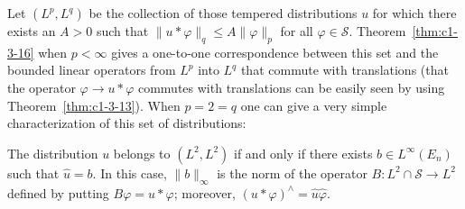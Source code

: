 Let $(L^{p}, L^{q})$ be the collection of those tempered distributions $u$ for
which there exists an $A > 0$ such that $\|u * \varphi\|_{q} \leq A \|\varphi\|_{p}$
for all $\varphi \in \mathscr{S}$. Theorem~\ref{thm:c1-3-16} when
$p < \infty$ gives a one-to-one correspondence between this set and the
bounded linear operators from $L^{p}$ into $L^{q}$ that commute with
translations (that the operator $\varphi \to u * \varphi$ commutes with
translations can be easily seen by using Theorem~\ref{thm:c1-3-13}). When
$p = 2 = q$ one can give a very simple characterization of this set of
distributions:

\begin{theorem}\label{thm:c1-3-18}
The distribution $u$ belongs to $(L^{2}, L^{2})$ if and only if there exists
$b \in L^{\infty}(E_{n})$ such that $\hat{u} = b$. In this case,
$\|b\|_{\infty}$ is the norm of the operator
$B\colon L^{2} \cap \mathscr{S} \to L^{2}$ defined by putting
$B\varphi = u * \varphi$; moreover, $(u * \varphi)^{\wedge} = \hat{u}\hat{\varphi}$.
\end{theorem}

